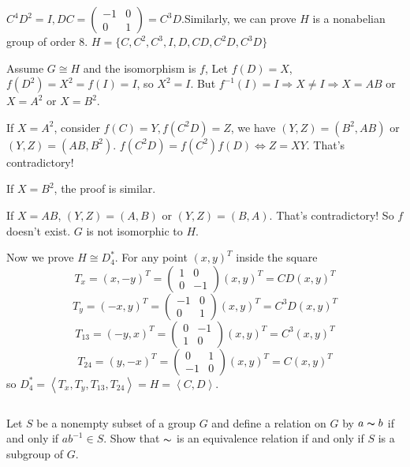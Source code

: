 \begin{answer}
    $C^{4}D^{2}=I, DC=\begin{pmatrix}
        -1&0\\0&1
    \end{pmatrix}=C^3D$.Similarly, we can prove $H$ is a nonabelian group of order 8. $H=\{C, C^{2}, C^{3}, I, D, CD, C^{2}D, C^{3}D\}$

    Assume $G\cong H$ and the isomorphism is $f$, Let $f(D)=X$, $f(D^{2})=X^{2}=f(I)=I$, so $X^{2}=I$. But $f^{-1}(I)=I\Rightarrow X\neq I\Rightarrow X=AB$ or $X=A^{2}$ or $X=B^{2}$. 
    
    If $X=A^{2}$, consider $f(C)=Y, f(C^{2}D)=Z$, we have $(Y,Z)=(B^{2},AB)$ or $(Y,Z)=(AB, B^{2})$. $f(C^{2}D)=f(C^{2})f(D)\Leftrightarrow Z=XY$. That's contradictory!

    If $X=B^{2}$, the proof is similar.

    If $X=AB$, $(Y,Z)=(A,B)$ or $(Y,Z)=(B,A)$. That's contradictory! So $f$ doesn't exist. $G$ is not isomorphic to $H$.

    Now we prove $H\cong D_4^*$. For any point $(x,y)^T$ inside the square
    \[T_x=(x,-y)^T=\begin{pmatrix}
        1&0\\0&-1
    \end{pmatrix}(x,y)^T=CD(x,y)^T\]
    \[T_y=(-x,y)^T=\begin{pmatrix}
        -1&0\\0&1
    \end{pmatrix}(x,y)^T=C^3D(x,y)^T\]
    \[T_{13}=(-y,x)^T=\begin{pmatrix}
        0&-1\\1&0
    \end{pmatrix}(x,y)^T=C^3(x,y)^T\]
    \[T_{24}=(y,-x)^T=\begin{pmatrix}
        0&1\\-1&0
    \end{pmatrix}(x,y)^T=C(x,y)^T\]
    so $D_4^*=\left\langle T_x,T_y, T_{13}, T_{24} \right\rangle=H=\left\langle C, D\right\rangle$.
\end{answer}

$$ $$

\begin{ex}
    Let $S$ be a nonempty subset of a group $G$ and define a relation on $G$ by $a \thicksim b$ if and only if $ab^{-1}\in S$. Show that $\thicksim$ is an equivalence relation if and only if $S$ is a subgroup of $G$.
\end{ex}

